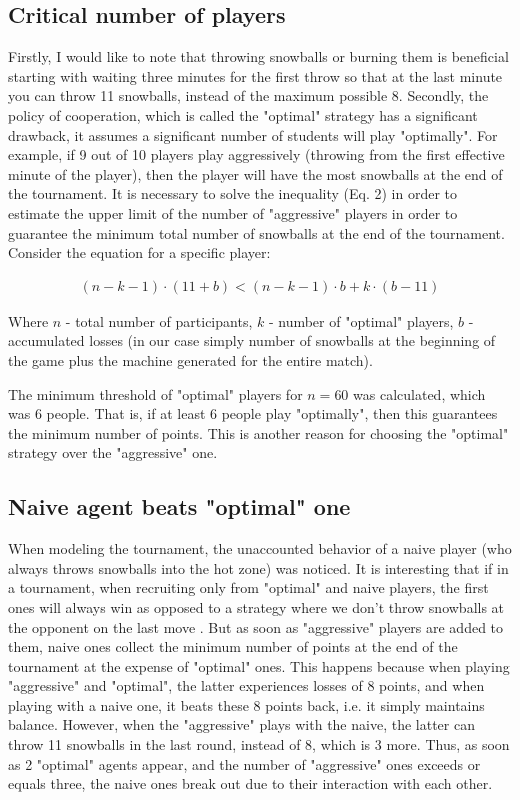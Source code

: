 \documentclass[conference]{IEEEtran}
\begin{document}
\subsection{Critical number of players}
Firstly, I would like to note that throwing snowballs or burning them is beneficial starting with waiting three minutes for the first throw so that at the last minute you can throw 11 snowballs, instead of the maximum possible 8. Secondly, the policy of cooperation, which is called the "optimal" strategy has a significant drawback, it assumes a significant number of students will play "optimally". For example, if 9 out of 10 players play aggressively (throwing from the first effective minute of the player), then the player will have the most snowballs at the end of the tournament. It is necessary to solve the inequality (Eq. 2) in order to estimate the upper limit of the number of "aggressive" players in order to guarantee the minimum total number of snowballs at the end of the tournament. Consider the equation for a specific player:

\begin{equation}
\begin{split}
(n - k - 1) \cdot (11 + b) < (n - k - 1) \cdot b + k \cdot (b - 11)
\end{split}
\end{equation}

Where $n$ - total number of participants, $k$ - number of "optimal" players, $b$ - accumulated losses (in our case simply number of snowballs at the beginning of the game plus the machine generated for the entire match).

The minimum threshold of "optimal" players for $n = 60$ was calculated, which was 6 people. That is, if at least 6 people play "optimally", then this guarantees the minimum number of points. This is another reason for choosing the "optimal" strategy over the "aggressive" one.

\subsection{Naive agent beats "optimal" one}
When modeling the tournament, the unaccounted behavior of a naive player (who always throws snowballs into the hot zone) was noticed. It is interesting that if in a tournament, when recruiting only from "optimal" and naive players, the first ones will always win as opposed to a strategy where we don't throw snowballs at the opponent on the last move \cite{b1, b3}. But as soon as "aggressive" players are added to them, naive ones collect the minimum number of points at the end of the tournament at the expense of "optimal" ones. This happens because when playing "aggressive" and "optimal", the latter experiences losses of 8 points, and when playing with a naive one, it beats these 8 points back, i.e. it simply maintains balance. However, when the "aggressive" plays with the naive, the latter can throw 11 snowballs in the last round, instead of 8, which is 3 more. Thus, as soon as 2 "optimal" agents appear, and the number of "aggressive" ones exceeds or equals three, the naive ones break out due to their interaction with each other.
\end{document}
